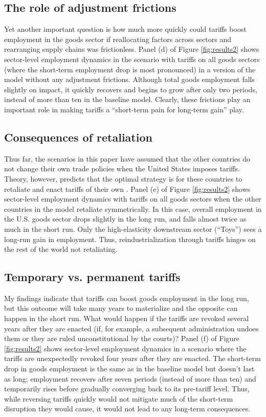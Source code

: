 \documentclass[12pt]{article}
\begin{document}
\subsection{The role of adjustment frictions}
Yet another important question is how much more quickly could tariffs boost employment in the goods sector if reallocating factors across sectors and rearranging supply chains was frictionless. Panel (d) of Figure \ref{fig:results2} shows sector-level employment dynamics in the scenario with tariffs on all goods sectors (where the short-term employment drop is most pronounced) in a version of the model without any adjustment frictions. Although total goods employment falls slightly on impact, it quickly recovers and begins to grow after only two periods, instead of more than ten in the baseline model. Clearly, these frictions play an important role in making tariffs a ``short-term pain for long-term gain'' play.

\subsection{Consequences of retaliation}
Thus far, the scenarios in this paper have assumed that the other countries do not change their own trade policies when the United States imposes tariffs. Theory, however, predicts that the optimal strategy is for these countries to retaliate and enact tariffs of their own \citep{pau-jack}. Panel (e) of Figure \ref{fig:results2} shows sector-level employment dynamics with tariffs on all goods sectors when the other countries in the model retaliate symmetrically. In this case, overall employment in the U.S. goods sector drops slightly in the long run, and falls almost twice as much in the short run. Only the high-elasticity downstream sector (``Toys'') sees a long-run gain in employment. Thus, reindustrialization through tariffs hinges on the rest of the world not retaliating.

\subsection{Temporary vs. permanent tariffs}
My findings indicate that tariffs can boost goods employment in the long run, but this outcome will take many years to materialize and the opposite can happen in the short run. What would happen if the tariffs are revoked several years after they are enacted (if, for example, a subsequent administration undoes them or they are ruled unconstitutional by the courts)? Panel (f) of Figure \ref{fig:results2} shows sector-level employment dynamics in a scenario where the tariffs are unexpectedly revoked four years after they are enacted. The short-term drop in goods employment is the same as in the baseline model but doesn't last as long; employment recovers after seven periods (instead of more than ten) and temporarily rises before gradually converging back to its pre-tariff level. Thus, while reversing tariffs quickly would not mitigate much of the short-term disruption they would cause, it would not lead to any long-term consequences.
\end{document}

